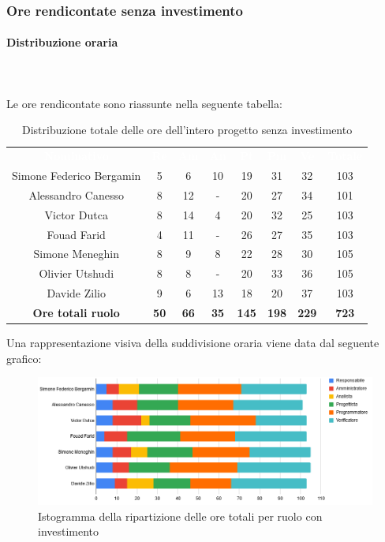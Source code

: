 \subsubsection{Ore rendicontate senza investimento}
\paragraph{Distribuzione oraria} \mbox{} \\ \mbox{} \\
Le ore rendicontate sono riassunte nella seguente tabella:

\begin{table}[H]
\centering\renewcommand{\arraystretch}{1.5}
\caption{Distribuzione totale delle ore dell'intero progetto senza investimento}
\vspace{0.2cm}
\begin{tabular}{ c c c c c c c c }
\rowcolor{redafk}
\textcolor{white}{\textbf{Nominativo}} & \textcolor{white}{\textbf{Re}} & 
\textcolor{white}{\textbf{Am}} & \textcolor{white}{\textbf{An}} &
\textcolor{white}{\textbf{Pt}} & \textcolor{white}{\textbf{Pm}} &
\textcolor{white}{\textbf{Ve}} & \textcolor{white}{\textbf{Totale}} \\
Simone Federico Bergamin 	& 5 	& 6 	& 10	& 19	& 31	& 32 	& 103 \\
Alessandro Canesso 			& 8 	& 12	& - 	& 20	& 27	& 34 	& 101 \\
Victor Dutca 				& 8 	& 14	& 4 	& 20	& 32	& 25 	& 103 \\
Fouad Farid					& 4 	& 11	& - 	& 26	& 27	& 35 	& 103 \\
Simone Meneghin 			& 8 	& 9 	& 8 	& 22	& 28	& 30 	& 105 \\
Olivier Utshudi 			& 8 	& 8 	& - 	& 20	& 33	& 36 	& 105 \\
Davide Zilio 				& 9 	& 6 	& 13	& 18	& 20	& 37 	& 103 \\
\rowcolor{lastrowcolor}
\textbf{Ore totali ruolo} & \textbf{50} & \textbf{66} & \textbf{35} & \textbf{145} & \textbf{198} & \textbf{229} & \textbf{723} \\
\end{tabular}
\end{table}

Una rappresentazione visiva della suddivisione oraria viene data dal seguente grafico:
\begin{figure}[H]
\centering
\includegraphics[scale=0.60]{img/grafici/tabella_tot_no_analisi.png}
\caption{Istogramma della ripartizione delle ore totali per ruolo con investimento}
\end{figure}

